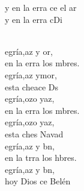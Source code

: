 \documentclass[12pt]{article}
\begin{document}
\begin{multicols*}{2}
\begin{cancion}%
	\begin{chorus}%
	y en la erra ce el ar\\
	y en la erra cDi\\
	\end{chorus}%
	\jump\\
	egría,az y or, \\
	en la erra los mbres.\\
	egría,az ymor, \\
	esta cheace Ds\\
	egría,ozo yaz,\\
	en la erra los mbres.\\
	egría,ozo yaz,\\
	esta ches Navad\\
	egría,az y bn, \\
	en la trra los hbres.\\
	egría,az y bn,\\
	hoy Dios ce  Belén\\
\end{cancion}%


\end{multicols*}
\end{document}
